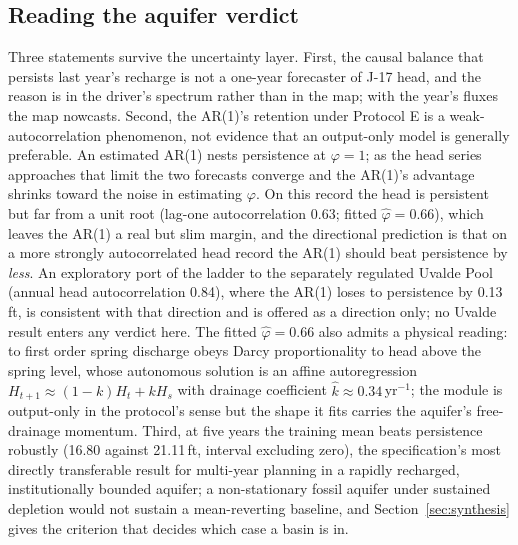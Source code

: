 \subsection{Reading the aquifer verdict}\label{sec:edwreading}

Three statements survive the uncertainty layer. First, the causal balance that persists last year's recharge is not a one-year forecaster of J-17 head, and the reason is in the driver's spectrum rather than in the map; with the year's fluxes the map nowcasts. Second, the AR(1)'s retention under Protocol E is a weak-autocorrelation phenomenon, not evidence that an output-only model is generally preferable. An estimated AR(1) nests persistence at $\varphi=1$; as the head series approaches that limit the two forecasts converge and the AR(1)'s advantage shrinks toward the noise in estimating $\varphi$. On this record the head is persistent but far from a unit root (lag-one autocorrelation 0.63; fitted $\hat\varphi=0.66$), which leaves the AR(1) a real but slim margin, and the directional prediction is that on a more strongly autocorrelated head record the AR(1) should beat persistence by \emph{less}. An exploratory port of the ladder to the separately regulated Uvalde Pool (annual head autocorrelation 0.84), where the AR(1) loses to persistence by 0.13\,ft, is consistent with that direction and is offered as a direction only; no Uvalde result enters any verdict here. The fitted $\hat\varphi=0.66$ also admits a physical reading: to first order spring discharge obeys Darcy proportionality to head above the spring level, whose autonomous solution is an affine autoregression $H_{t+1}\approx(1-k)H_t+kH_s$ with drainage coefficient $\hat k\approx0.34$\,yr$^{-1}$; the module is output-only in the protocol's sense but the shape it fits carries the aquifer's free-drainage momentum. Third, at five years the training mean beats persistence robustly (16.80 against 21.11\,ft, interval excluding zero), the specification's most directly transferable result for multi-year planning in a rapidly recharged, institutionally bounded aquifer; a non-stationary fossil aquifer under sustained depletion would not sustain a mean-reverting baseline, and Section~\ref{sec:synthesis} gives the criterion that decides which case a basin is in.

